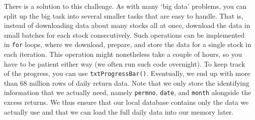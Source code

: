\documentclass[
]{krantz}
\begin{document}
There is a solution to this challenge. As with many `big data' problems, you can split up the big task into several smaller tasks that are easy to handle. That is, instead of downloading data about many stocks all at once, download the data in small batches for each stock consecutively. Such operations can be implemented in \texttt{for} loops, where we download, prepare, and store the data for a single stock in each iteration. This operation might nonetheless take a couple of hours, so you have to be patient either way (we often run such code overnight). To keep track of the progress, you can use \texttt{txtProgressBar()}. Eventually, we end up with more than 68 million rows of daily return data. Note that we only store the identifying information that we actually need, namely \texttt{permno}, \texttt{date}, and \texttt{month} alongside the excess returns. We thus ensure that our local database contains only the data we actually use and that we can load the full daily data into our memory later.
\end{document}
